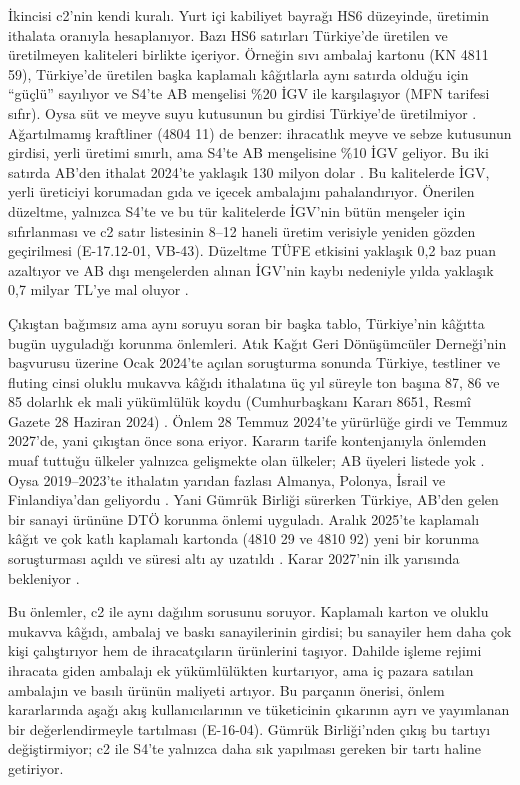 İkincisi c2'nin kendi kuralı. Yurt içi kabiliyet bayrağı HS6 düzeyinde, üretimin ithalata oranıyla hesaplanıyor. Bazı HS6 satırları Türkiye'de üretilen ve üretilmeyen kaliteleri birlikte içeriyor. Örneğin sıvı ambalaj kartonu (KN 4811 59), Türkiye'de üretilen başka kaplamalı kâğıtlarla aynı satırda olduğu için ``güçlü'' sayılıyor ve S4'te AB menşelisi \%20 İGV ile karşılaşıyor (MFN tarifesi sıfır). Oysa süt ve meyve suyu kutusunun bu girdisi Türkiye'de üretilmiyor \etiketH{}. Ağartılmamış kraftliner (4804 11) de benzer: ihracatlık meyve ve sebze kutusunun girdisi, yerli üretimi sınırlı, ama S4'te AB menşelisine \%10 İGV geliyor. Bu iki satırda AB'den ithalat 2024'te yaklaşık 130 milyon dolar \etiketT{}. Bu kalitelerde İGV, yerli üreticiyi korumadan gıda ve içecek ambalajını pahalandırıyor. Önerilen düzeltme, yalnızca S4'te ve bu tür kalitelerde İGV'nin bütün menşeler için sıfırlanması ve c2 satır listesinin 8--12 haneli üretim verisiyle yeniden gözden geçirilmesi (E-17.12-01, VB-43). Düzeltme TÜFE etkisini yaklaşık 0,2 baz puan azaltıyor ve AB dışı menşelerden alınan İGV'nin kaybı nedeniyle yılda yaklaşık 0,7 milyar TL'ye mal oluyor \etiketT{}.

Çıkıştan bağımsız ama aynı soruyu soran bir başka tablo, Türkiye'nin kâğıtta bugün uyguladığı korunma önlemleri. Atık Kağıt Geri Dönüşümcüler Derneği'nin başvurusu üzerine Ocak 2024'te açılan soruşturma sonunda Türkiye, testliner ve fluting cinsi oluklu mukavva kâğıdı ithalatına üç yıl süreyle ton başına 87, 86 ve 85 dolarlık ek mali yükümlülük koydu (Cumhurbaşkanı Kararı 8651, Resmî Gazete 28 Haziran 2024) \etiketV{}. Önlem 28 Temmuz 2024'te yürürlüğe girdi ve Temmuz 2027'de, yani çıkıştan önce sona eriyor. Kararın tarife kontenjanıyla önlemden muaf tuttuğu ülkeler yalnızca gelişmekte olan ülkeler; AB üyeleri listede yok \etiketV{}. Oysa 2019--2023'te ithalatın yarıdan fazlası Almanya, Polonya, İsrail ve Finlandiya'dan geliyordu \etiketV{}. Yani Gümrük Birliği sürerken Türkiye, AB'den gelen bir sanayi ürününe DTÖ korunma önlemi uyguladı. Aralık 2025'te kaplamalı kâğıt ve çok katlı kaplamalı kartonda (4810 29 ve 4810 92) yeni bir korunma soruşturması açıldı ve süresi altı ay uzatıldı \etiketV{}. Karar 2027'nin ilk yarısında bekleniyor \etiketT{}.

Bu önlemler, c2 ile aynı dağılım sorusunu soruyor. Kaplamalı karton ve oluklu mukavva kâğıdı, ambalaj ve baskı sanayilerinin girdisi; bu sanayiler hem daha çok kişi çalıştırıyor hem de ihracatçıların ürünlerini taşıyor. Dahilde işleme rejimi ihracata giden ambalajı ek yükümlülükten kurtarıyor, ama iç pazara satılan ambalajın ve basılı ürünün maliyeti artıyor. Bu parçanın önerisi, önlem kararlarında aşağı akış kullanıcılarının ve tüketicinin çıkarının ayrı ve yayımlanan bir değerlendirmeyle tartılması (E-16-04). Gümrük Birliği'nden çıkış bu tartıyı değiştirmiyor; c2 ile S4'te yalnızca daha sık yapılması gereken bir tartı haline getiriyor.

